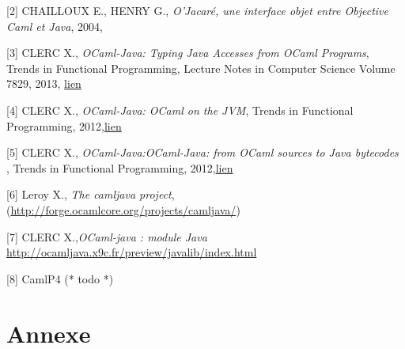 \documentclass[a4paper, 11pt, notitlepage]{article}
\begin{document}
[2] CHAILLOUX E., HENRY G., \emph{O’Jacaré, une interface objet
  entre Objective Caml et Java}, 2004,

[3] CLERC X., \emph{OCaml-Java: Typing Java Accesses from OCaml
  Programs}, Trends in Functional Programming, Lecture Notes in
Computer Science Volume 7829,
2013, \href{http://www.cs.ru.nl/P.Achten/IFL2013/symposium_proceedings_IFL2013/ifl2013_submission_17.pdf}{lien}

[4] CLERC X., \emph{OCaml-Java: OCaml on the JVM}, Trends in
Functional Programming,
2012,\href{}{lien}

[5] CLERC X., \emph{OCaml-Java:OCaml-Java: from OCaml sources to Java bytecodes }, Trends in Functional Programming, 2012,\href{http://www.lexifi.com/ml2012/full9.pdf}{lien}

[6] Leroy X., \emph{The camljava project},
(\url{http://forge.ocamlcore.org/projects/camljava/})

[7] CLERC X.,\emph{OCaml-java : module Java} \url{http://ocamljava.x9c.fr/preview/javalib/index.html}

[8] CamlP4 (* todo *)












\newpage
\section*{Annexe}
\end{document}
